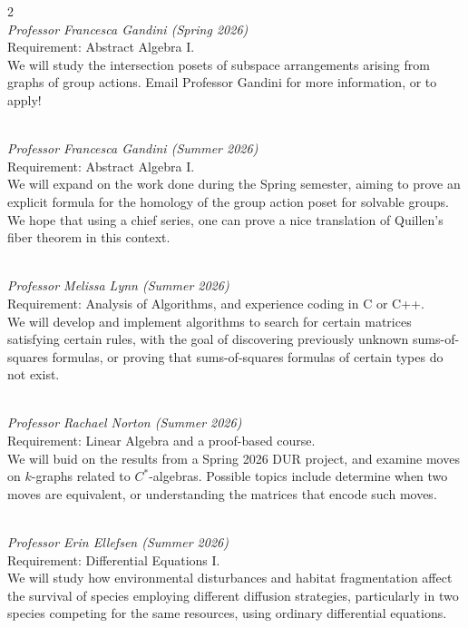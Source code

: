 \documentclass[12pt]{article}
\begin{document}
\begin{multicols}{2}
 \\ \textit{Professor Francesca Gandini (Spring 2026)} \\ Requirement: Abstract Algebra I. \\ We will study the intersection posets of subspace arrangements arising from graphs of group actions. Email Professor Gandini for more information, or to apply! \vspace{0.25cm}

 \\ \textit{Professor Francesca Gandini (Summer 2026)} \\ Requirement: Abstract Algebra I. \\ We will expand on the work done during the Spring semester, aiming to prove an explicit formula for the homology of the group action poset for solvable groups. We hope that using a chief series, one can prove a nice translation of Quillen’s fiber theorem in this context. \vspace{0.25cm}

 \\ \textit{Professor Melissa Lynn (Summer 2026)} \\ Requirement: Analysis of Algorithms, and experience coding in C or C++.\\ We will develop and implement algorithms to search for certain matrices satisfying certain rules, with the goal of discovering previously unknown sums-of-squares formulas, or proving that sums-of-squares formulas of certain types do not exist. \vspace{0.25cm}

 \\ \textit{Professor Rachael Norton (Summer 2026)} \\ Requirement: Linear Algebra and a proof-based course. \\ We will buid on the results from a Spring 2026 DUR project, and examine moves on $k$-graphs related to $C^{*}$-algebras. Possible topics include determine when two moves are equivalent, or understanding the matrices that encode such moves. \vspace{0.25cm}

 \\ \textit{Professor Erin Ellefsen (Summer 2026)} \\ Requirement: Differential Equations I. \\ We will study how environmental disturbances and habitat fragmentation affect the survival of species employing different diffusion strategies, particularly in two species competing for the same resources, using ordinary differential equations. \vspace{1.5cm}


\end{multicols} \vspace{0.5cm}
\end{document}

